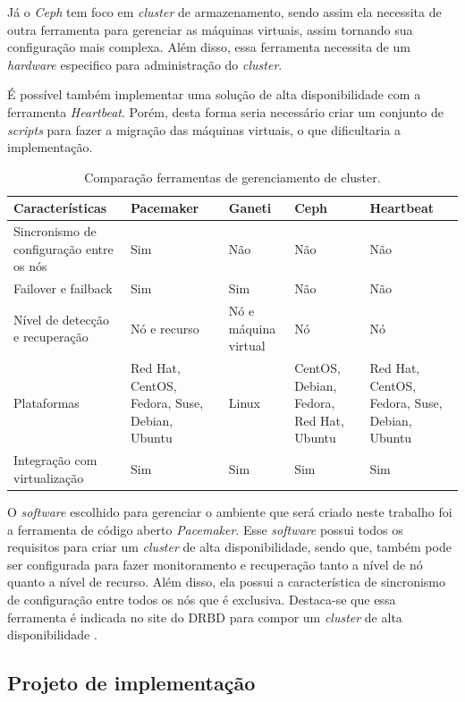 Já o \textit{Ceph} tem foco em \textit{cluster} de armazenamento, sendo assim ela necessita de outra ferramenta para gerenciar as máquinas 
virtuais, assim tornando sua configuração mais complexa. Além disso, essa ferramenta necessita de um \textit{hardware} especifico para 
administração do \textit{cluster}.

É possível também implementar uma solução de alta disponibilidade com a ferramenta \textit{Heartbeat}. Porém, desta forma seria necessário criar 
um conjunto de \textit{scripts} para fazer a migração das máquinas virtuais, o que dificultaria a implementação.

\begin{table}[h!]
\caption{Comparação ferramentas de gerenciamento de cluster.}
\label{tab:clusterger}
\begin{center}
\begin{tabular}{|p{3.5cm}|p{2.7cm}|p{2cm}|p{2.7cm}|p{2.7cm}|}\hline
Características & Pacemaker & Ganeti & Ceph & Heartbeat \\\hline
Sincronismo de configuração entre os nós & Sim & Não & Não & Não \\\hline
Failover e failback & Sim & Sim & Não & Não \\\hline
Nível de detecção e recuperação & Nó e recurso & Nó e máquina virtual & Nó & Nó \\\hline
Plataformas & Red Hat, CentOS, Fedora, Suse, Debian, Ubuntu & Linux & CentOS, Debian, Fedora, Red Hat, Ubuntu & Red Hat, CentOS, Fedora, Suse, Debian, Ubuntu \\\hline
Integração com virtualização & Sim & Sim & Sim & Sim \\\hline
\end{tabular}
\end{center}
\end{table}

O \textit{software} escolhido para gerenciar o ambiente que será criado neste trabalho foi a ferramenta de código aberto \textit{Pacemaker}. 
Esse \textit{software} possui todos os requisitos para criar um \textit{cluster} de alta disponibilidade, sendo que, também pode ser configurada 
para fazer monitoramento e recuperação tanto a nível de nó quanto a nível de recurso. Além disso, ela possui a característica de sincronismo de 
configuração entre todos os nós que é exclusiva. Destaca-se que essa ferramenta é indicada no site do \ac{DRBD} para compor um \textit{cluster} 
de alta disponibilidade \cite{drbd}.

\subsection{Projeto de implementação}
\label{section:projetoimpl}

